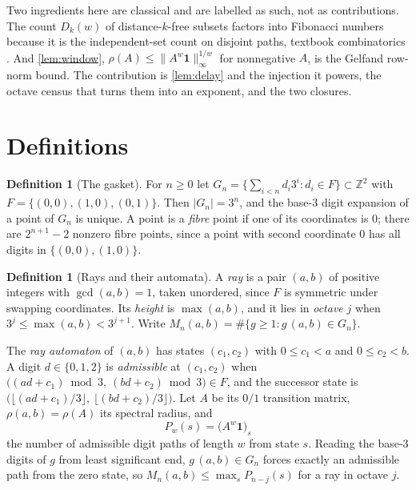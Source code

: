 \documentclass[11pt]{amsart}
\theoremstyle{definition}
\newtheorem{definition}[theorem]{Definition}
\theoremstyle{remark}
\begin{document}
Two ingredients here are classical and are labelled as such, not as contributions. The count $D_k(w)$ of distance-$k$-free subsets factors into Fibonacci numbers because it is the independent-set count on disjoint paths, textbook combinatorics \cite{oeisfib}. And \cref{lem:window}, $\rho(A) \le \|A^w \mathbf 1\|_\infty^{1/w}$ for nonnegative $A$, is the Gelfand row-norm bound. The contribution is \cref{lem:delay} and the injection it powers, the octave census that turns them into an exponent, and the two closures.

\section{Definitions}
\label{sec:defs}

\begin{definition}[The gasket]
\label{def:gasket}
For $n \ge 0$ let $G_n = \bigl\{ \sum_{i<n} d_i 3^i : d_i \in F \bigr\} \subset \mathbb Z^2$ with $F = \{(0,0),(1,0),(0,1)\}$. Then $|G_n| = 3^n$, and the base-$3$ digit expansion of a point of $G_n$ is unique. A point is a \emph{fibre} point if one of its coordinates is $0$; there are $2^{n+1} - 2$ nonzero fibre points, since a point with second coordinate $0$ has all digits in $\{(0,0),(1,0)\}$.
\end{definition}

\begin{definition}[Rays and their automata]
\label{def:ray}
A \emph{ray} is a pair $(a,b)$ of positive integers with $\gcd(a,b) = 1$, taken unordered, since $F$ is symmetric under swapping coordinates. Its \emph{height} is $\max(a,b)$, and it lies in \emph{octave} $j$ when $3^j \le \max(a,b) < 3^{j+1}$. Write $M_n(a,b) = \#\{g \ge 1 : g\,(a,b) \in G_n\}$.

The \emph{ray automaton} of $(a,b)$ has states $(c_1,c_2)$ with $0 \le c_1 < a$ and $0 \le c_2 < b$. A digit $d \in \{0,1,2\}$ is \emph{admissible} at $(c_1,c_2)$ when $\bigl((ad + c_1) \bmod 3,\ (bd + c_2) \bmod 3\bigr) \in F$, and the successor state is $\bigl(\lfloor (ad+c_1)/3 \rfloor,\ \lfloor (bd+c_2)/3 \rfloor\bigr)$. Let $A$ be its $0/1$ transition matrix, $\rho(a,b) = \rho(A)$ its spectral radius, and
\[
  P_w(s) = \bigl(A^w \mathbf 1\bigr)_s
\]
the number of admissible digit paths of length $w$ from state $s$. Reading the base-$3$ digits of $g$ from least significant end, $g\,(a,b) \in G_n$ forces exactly an admissible path from the zero state, so $M_n(a,b) \le \max_s P_{n-j}(s)$ for a ray in octave $j$.
\end{definition}
\end{document}
